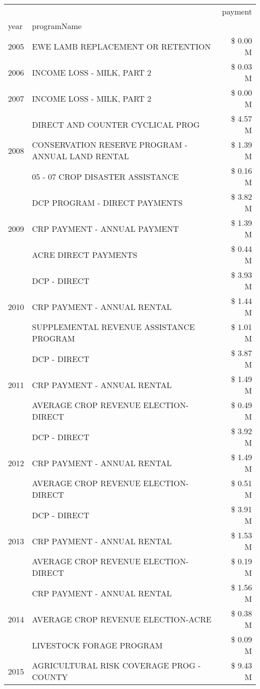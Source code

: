 \begin{tabular}{llr}
\toprule
 &  & payment \\
year & programName &  \\
\midrule
2005 & EWE LAMB REPLACEMENT OR RETENTION & \$ 0.00 M \\
\cline{1-3}
2006 & INCOME LOSS - MILK, PART 2 & \$ 0.03 M \\
\cline{1-3}
2007 & INCOME LOSS - MILK, PART 2 & \$ 0.00 M \\
\cline{1-3}
\multirow[t]{3}{*}{2008} & DIRECT AND COUNTER CYCLICAL PROG & \$ 4.57 M \\
 & CONSERVATION RESERVE PROGRAM - ANNUAL LAND RENTAL & \$ 1.39 M \\
 & 05 - 07 CROP DISASTER ASSISTANCE & \$ 0.16 M \\
\cline{1-3}
\multirow[t]{3}{*}{2009} & DCP PROGRAM - DIRECT PAYMENTS & \$ 3.82 M \\
 & CRP PAYMENT - ANNUAL PAYMENT & \$ 1.39 M \\
 & ACRE DIRECT PAYMENTS & \$ 0.44 M \\
\cline{1-3}
\multirow[t]{3}{*}{2010} & DCP - DIRECT & \$ 3.93 M \\
 & CRP PAYMENT - ANNUAL RENTAL & \$ 1.44 M \\
 & SUPPLEMENTAL REVENUE ASSISTANCE PROGRAM & \$ 1.01 M \\
\cline{1-3}
\multirow[t]{3}{*}{2011} & DCP - DIRECT & \$ 3.87 M \\
 & CRP PAYMENT - ANNUAL RENTAL & \$ 1.49 M \\
 & AVERAGE CROP REVENUE ELECTION-DIRECT & \$ 0.49 M \\
\cline{1-3}
\multirow[t]{3}{*}{2012} & DCP - DIRECT & \$ 3.92 M \\
 & CRP PAYMENT - ANNUAL RENTAL & \$ 1.49 M \\
 & AVERAGE CROP REVENUE ELECTION-DIRECT & \$ 0.51 M \\
\cline{1-3}
\multirow[t]{3}{*}{2013} & DCP - DIRECT & \$ 3.91 M \\
 & CRP PAYMENT - ANNUAL RENTAL & \$ 1.53 M \\
 & AVERAGE CROP REVENUE ELECTION-DIRECT & \$ 0.19 M \\
\cline{1-3}
\multirow[t]{3}{*}{2014} & CRP PAYMENT - ANNUAL RENTAL & \$ 1.56 M \\
 & AVERAGE CROP REVENUE ELECTION-ACRE & \$ 0.38 M \\
 & LIVESTOCK FORAGE PROGRAM & \$ 0.09 M \\
\cline{1-3}
\multirow[t]{3}{*}{2015} & AGRICULTURAL RISK COVERAGE PROG - COUNTY & \$ 9.43 M \\

\end{tabular}
